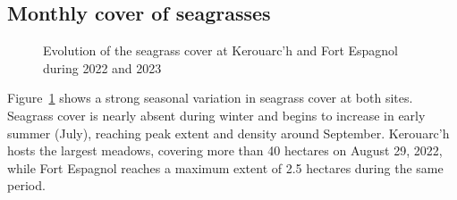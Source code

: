 \documentclass[
  number]{elsarticle}
\begin{document}
\subsection{Monthly cover of
seagrasses}\label{monthly-cover-of-seagrasses}

\label{cell-fig-Pheno}
\begin{figure}[H]


\caption{\label{fig-Pheno}Evolution of the seagrass cover at Kerouarc'h
and Fort Espagnol during 2022 and 2023}

\end{figure}%

Figure~\ref{fig-Pheno} shows a strong seasonal variation in seagrass
cover at both sites. Seagrass cover is nearly absent during winter and
begins to increase in early summer (July), reaching peak extent and
density around September. Kerouarc'h hosts the largest meadows, covering
more than 40 hectares on August 29, 2022, while Fort Espagnol reaches a
maximum extent of 2.5 hectares during the same period.



\end{document}
